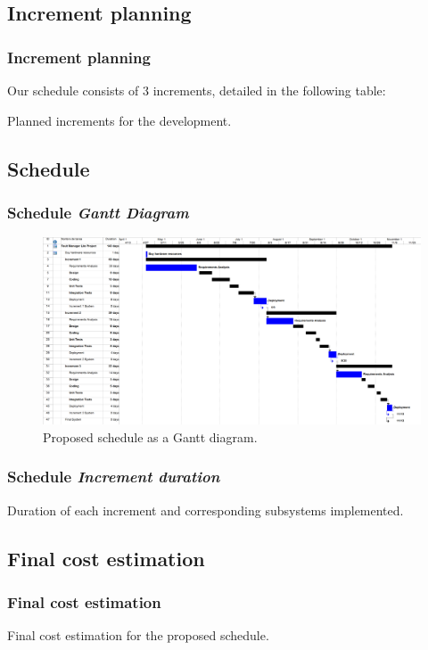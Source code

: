 \documentclass[10pt, compress,usetitleprogressbar,aspectratio=1610]{beamer}
\begin{document}
\subsection{Increment planning}
\begin{frame}
\frametitle{Increment planning}

Our schedule consists of 3 increments, detailed in the following table:

\begin{table}[hbtp]
\centering

\caption{Planned increments for the development.}
\label{tblIncrements}
\end{table}
\end{frame}

\subsection{Schedule}
\begin{frame}
\frametitle{Schedule \hfill \emph{Gantt Diagram}}
\begin{figure}[hbtp]
\centering
\includegraphics[width=\textwidth]{../GanttDiagram.png}
\caption{Proposed schedule as a Gantt diagram.}
\label{figGantt}
\end{figure}
\end{frame}

\begin{frame}
\frametitle{Schedule \hfill \emph{Increment duration}}
\begin{table}[hbtp]
\centering

\caption{Duration of each increment and corresponding subsystems implemented.}
\label{tblCostEstimate}
\end{table}
\end{frame}

\subsection{Final cost estimation}
\begin{frame}
\frametitle{Final cost estimation}
\begin{table}[hbtp]
\centering

\caption{Final cost estimation for the proposed schedule.}
\label{tblCostEstimate}
\end{table}
\end{frame}
\end{document}
